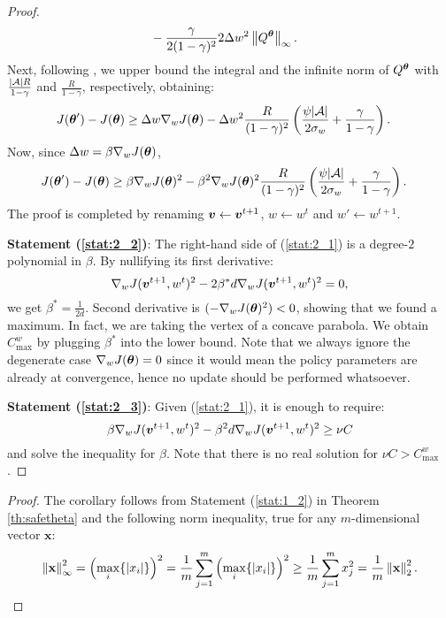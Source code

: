 \begin{proof}
\begin{align*}
&- \frac{\gamma}{2(1-\gamma)^2}
2\Delta w^2
\norm[\infty]{Q^{\vtheta}}.
\end{align*}
Next, following \cite{adaptive_step}, we upper bound the integral and the infinite norm of $Q^{\vtheta}$ with $\frac{|\Aspace|R}{1-\gamma}$ and $\frac{R}{1-\gamma}$, respectively, obtaining:
\begin{align}
J(\vtheta') - J(\vtheta)
&\geq \Delta w\gradJ[w]{\vtheta} - 
\Delta w^2
\frac{R}{(1-\gamma)^2}\left(
\frac{\psi|\Aspace|}{2\sigma_w} + 
\frac{\gamma}{1-\gamma}\right).\label{eq:4_1_2}
\end{align}
Now, since $\Delta w = \beta\gradJ[w]{\vtheta}$,
\begin{align*}
J(\vtheta') - J(\vtheta)
&\geq \beta\gradJ[w]{\vtheta}^2 - 
\beta^2\gradJ[w]{\vtheta}^2
\frac{R}{(1-\gamma)^2}\left(
\frac{\psi|\Aspace|}{2\sigma_w} + 
\frac{\gamma}{1-\gamma}\right).
\end{align*}
The proof is completed by renaming $\vv\gets\vv^{t+1}$, $w\gets w^t$ and $w'\gets w^{t+1}$.

\textbf{Statement (\ref{stat:2_2})}:
The right-hand side of (\ref{stat:2_1}) is a degree-$2$ polynomial in $\beta$. By nullifying its first derivative:
\[
	\gradJ[w]{\vv^{t+1}, w^t}^2 - 2\beta^* d\gradJ[w]{\vv^{t+1},w^t}^2 = 0,
\]
we get $\beta^* = \frac{1}{2d}$. Second derivative is $(-\gradJ[w]{\vtheta}^2)<0$, showing that we found a maximum. In fact, we are taking the vertex of a concave parabola. We obtain $C_{\text{max}}^w$ by plugging $\beta^*$ into the lower bound. Note that we always ignore the degenerate case $\gradJ[w]{\vtheta}=0$ since it would mean the policy parameters are already at convergence, hence no update should be performed whatsoever.

\textbf{Statement (\ref{stat:2_3})}:
Given (\ref{stat:2_1}), it is enough to require:
\[
	\beta\gradJ[w]{\vv^{t+1},w^t}^2 - \beta^2d\gradJ[w]{\vv^{t+1},w^t}^2 \geq \nu C
\]
and solve the inequality for $\beta$. Note that there is no real solution for $\nu C>C_{\text{max}}^w$.
\end{proof}

\simplev*
\begin{proof}
The corollary follows from Statement (\ref{stat:1_2}) in Theorem \ref{th:safetheta} and the following norm inequality, true for any $m$-dimensional vector $\mathbf{x}$:
\[
	\norm[\infty]{\mathbf{x}}^2 = \left(\max_i\{|x_i|\}\right)^2 = \frac{1}{m}\sum_{j=1}^m \left(\max_i\{|x_i|\}\right)^2
	\geq \frac{1}{m}\sum_{j=1}^m x_j^2 = \frac{1}{m}\norm[2]{\mathbf{x}}^2.
\]

\end{proof}

